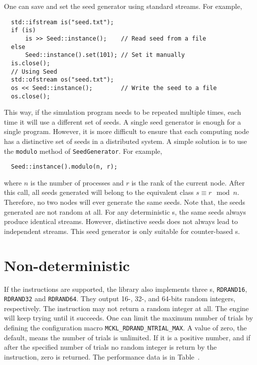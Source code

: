 One can save and set the seed generator using standard \cpp streams. For
example,
\begin{Verbatim}
  std::ifstream is("seed.txt");
  if (is)
      is >> Seed::instance();    // Read seed from a file
  else
      Seed::instance().set(101); // Set it manually
  is.close();
  // Using Seed
  std::ofstream os("seed.txt");
  os << Seed::instance();        // Write the seed to a file
  os.close();
\end{Verbatim}
This way, if the simulation program needs to be repeated multiple times, each
time it will use a different set of seeds. A single seed generator is enough
for a single program. However, it is more difficult to ensure that each
computing node has a distinctive set of seeds in a distributed system. A simple
solution is to use the \verb|modulo| method of \verb|SeedGenerator|. For
example,
\begin{Verbatim}
  Seed::instance().modulo(n, r);
\end{Verbatim}
where $n$ is the number of processes and $r$ is the rank of the current node.
After this call, all seeds generated will belong to the equivalent class $s
\equiv r \mod n$. Therefore, no two nodes will ever generate the same seeds.
Note that, the seeds generated are not random at all. For any deterministic
\rng{}s, the same seeds always produce identical streams. However, distinctive
seeds does not always lead to independent streams. This seed generator is only
suitable for counter-based \rng{}s.

\section{Non-deterministic \protect\rng}
\label{sec:Non-deterministic RNG}

If the \rdrand instructions are supported, the library also implements three
\rng{}s, \verb|RDRAND16|, \verb|RDRAND32| and \verb|RDRAND64|. They output 16-,
32-, and 64-bits random integers, respectively. The \rdrand instruction may not
return a random integer at all. The \rng engine will keep trying until it
succeeds. One can limit the maximum number of trials by defining the
configuration macro \verb|MCKL_RDRAND_NTRIAL_MAX|. A value of zero, the
default, means the number of trials is unlimited. If it is a positive number,
and if after the specified number of trials no random integer is return by the
\rdrand instruction, zero is returned. The performance data is in
Table~.


